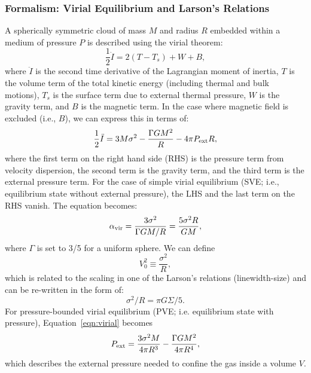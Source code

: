 \documentclass[iop]{emulateapj} %
\begin{document}
\subsubsection{Formalism: Virial Equilibrium and Larson's Relations}  \label{sec:PVE}
A spherically symmetric cloud of mass $M$ and radius $R$ embedded within
a medium of pressure $P$ is described using the virial theorem:
\begin{equation}
\frac{1}{2}\ddot I = 2(T - T_s) + W + B,
\end{equation}
where $\ddot I$ is the second time derivative of the Lagrangian moment of inertia,
$T$ is the volume term of the total kinetic energy (including thermal and
bulk motions), $T_s$ is the surface term due to external thermal pressure,
$W$ is the gravity term, and $B$ is the magnetic term.
In the case where magnetic field is excluded (i.e., $B$), we can express this in terms of:
\begin{equation}
\frac{1}{2}\ddot I = 3 M \sigma^2 - \frac{\Gamma GM^2}{R} - 4\pi P_{\rm ext} R,
\label{eqn:virial}
\end{equation}
where the first term on the right hand side (RHS) is the pressure term from velocity dispersion, the second
term is the gravity term, and the third term is the external pressure term.
For the case of simple virial equilibrium (SVE; i.e., equilibrium state without external pressure),
the LHS and the last term on the RHS vanish. The equation becomes:
\begin{equation}
\alpha_{\rm vir} = \frac{3\sigma^2}{\Gamma GM/R} = \frac{5\sigma^2R}{GM},
\end{equation}
where $\Gamma$ is set to 3/5 for a uniform sphere.
We can define
\begin{equation}
V_0^2\equiv\frac{\sigma^2}{R},
\end{equation}
which is related to the scaling in one of the Larson's relations (linewidth-size)
and can be re-written in the form of:
\begin{equation}
\sigma^2/R = \pi G \Sigma/5.
\end{equation}
For pressure-bounded virial equilibrium (PVE; i.e. equilibrium state with pressure), %
Equation~\ref{eqn:virial} becomes
\begin{equation}
P_{\rm ext} = \frac{3\sigma^2M}{4\pi R^3} - \frac{\Gamma G M^2}{4\pi R^4},
\label{eqn:pext}
\end{equation}
which describes the external pressure needed to confine the gas inside a volume $V$.
\end{document}
